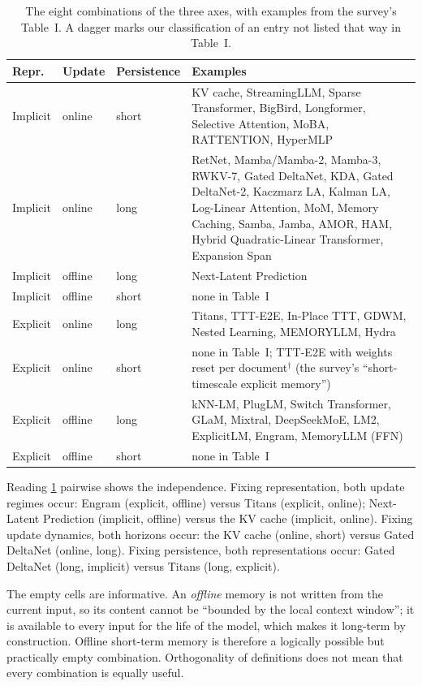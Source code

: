 \begin{table}[t]
\centering\small
\caption{The eight combinations of the three axes, with examples from the survey's Table~I.
A dagger marks our classification of an entry not listed that way in Table~I.}
\label{tab:c02-cube}
\begin{tabularx}{\textwidth}{@{}l l l >{\raggedright\arraybackslash}X@{}}
\toprule
Repr. & Update & Persistence & Examples \\
\midrule
Implicit & online & short & KV cache, StreamingLLM, Sparse Transformer, BigBird, Longformer,
Selective Attention, MoBA, RATTENTION, HyperMLP \\
Implicit & online & long & RetNet, Mamba/Mamba-2, Mamba-3, RWKV-7, Gated DeltaNet, KDA, Gated
DeltaNet-2, Kaczmarz LA, Kalman LA, Log-Linear Attention, MoM, Memory Caching, Samba, Jamba, AMOR,
HAM, Hybrid Quadratic-Linear Transformer, Expansion Span \\
Implicit & offline & long & Next-Latent Prediction \\
Implicit & offline & short & none in Table~I \\
Explicit & online & long & Titans, TTT-E2E, In-Place TTT, GDWM, Nested Learning, MEMORYLLM, Hydra \\
Explicit & online & short & none in Table~I; TTT-E2E with weights reset per document$^{\dagger}$
(the survey's ``short-timescale explicit memory'') \\
Explicit & offline & long & kNN-LM, PlugLM, Switch Transformer, GLaM, Mixtral, DeepSeekMoE, LM2,
ExplicitLM, Engram, MemoryLLM (FFN) \\
Explicit & offline & short & none in Table~I \\
\bottomrule
\end{tabularx}
\end{table}

Reading \cref{tab:c02-cube} pairwise shows the independence. Fixing representation, both update
regimes occur: Engram (explicit, offline) versus Titans (explicit, online); Next-Latent Prediction
(implicit, offline) versus the KV cache (implicit, online). Fixing update dynamics, both horizons
occur: the KV cache (online, short) versus Gated DeltaNet (online, long). Fixing persistence, both
representations occur: Gated DeltaNet (long, implicit) versus Titans (long, explicit).

The empty cells are informative. An \emph{offline} memory is not written from the current input,
so its content cannot be ``bounded by the local context window''; it is available to every input
for the life of the model, which makes it long-term by construction. Offline short-term memory is
therefore a logically possible but practically empty combination. Orthogonality of definitions
does not mean that every combination is equally useful.

